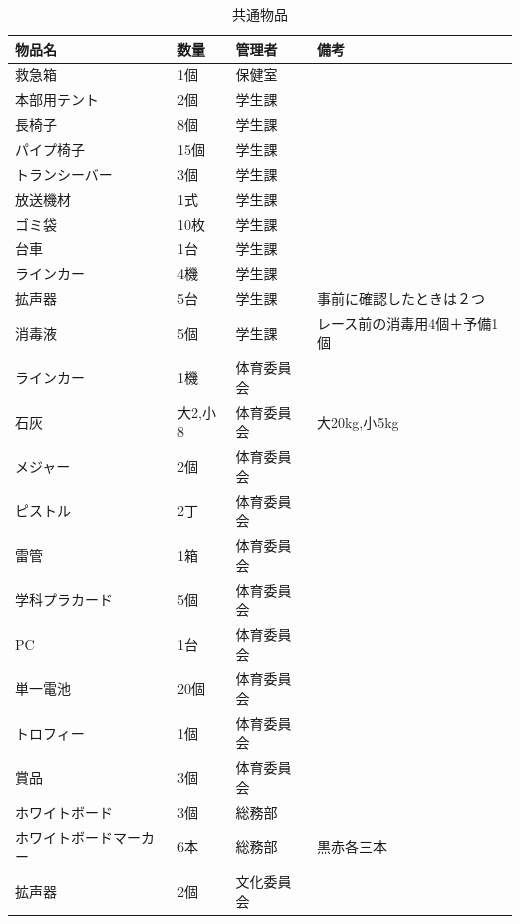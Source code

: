 \documentclass[titlepage]{jarticle}
\begin{document}
\begin{table}[H]
\centering
\caption{共通物品}
\begin{tabular}{llll}
     物品名&数量&管理者&備考\\ \hline\hline
救急箱         & 1個    & 保健室   &                 \\
本部用テント      & 2個    & 学生課   &                 \\
長椅子         & 8個    & 学生課   &                 \\
パイプ椅子       & 15個   & 学生課   &            \\
トランシーバー     & 3個    & 学生課   &                 \\
放送機材        & 1式    & 学生課   &                 \\
ゴミ袋         & 10枚   & 学生課   &                 \\
台車          & 1台    & 学生課   &                 \\
ラインカー       & 4機    & 学生課   &                 \\
拡声器         &  5台   & 学生課   & 事前に確認したときは２つ       \\
消毒液         & 5個    & 学生課   & レース前の消毒用4個＋予備1個 \\
ラインカー       & 1機    & 体育委員会 &                 \\
石灰          & 大2,小8 & 体育委員会 & 大20kg,小5kg      \\
メジャー        & 2個    & 体育委員会 &                 \\
ピストル        & 2丁    & 体育委員会 &                 \\
雷管          & 1箱    & 体育委員会 &                 \\
学科プラカード     & 5個    & 体育委員会 &                 \\
PC          & 1台    & 体育委員会 &                 \\
単一電池        & 20個   & 体育委員会 &                 \\
トロフィー       & 1個    & 体育委員会 &                 \\
賞品          & 3個    & 体育委員会 &                 \\
ホワイトボード     & 3個    & 総務部   &                 \\
ホワイトボードマーカー & 6本    & 総務部   & 黒赤各三本           \\
拡声器         & 2個    & 文化委員会 &                
\end{tabular}
\end{table}
\end{document}
